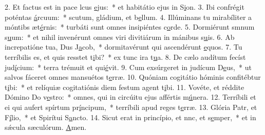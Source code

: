 2. Et factus est in pace lcus \uline{e}jus:~* et habitátio ejus in S\uline{i}on.
3. Ibi confrégit poténtas \uline{á}rcuum:~* scutum, gládium, et b\uline{e}llum.
4. Illúminans tu mirabíliter a móntibs æt\uline{é}rnis:~* turbáti sunt omnes insipiéntes c\uline{o}rde.
5. Dormiérunt smnum s\uline{u}um:~* et nihil invenérunt omnes viri divitiárum in mánibus s\uline{u}is.
6. Ab increpatióne tua, Dus J\uline{a}cob,~* dormitavérunt qui ascendérunt \uline{e}quos.
7. Tu terríbilis es, et quis resstet t\uline{i}bi?~* ex tunc ira t\uline{u}a.
8. De cælo audítum fecíst jud\uline{í}cium:~* terra trémuit et qui\uline{é}vit.
9. Cum exsúrgeret in judícum D\uline{e}us,~* ut salvos fáceret omnes mansuétos t\uline{e}rræ.
10. Quóniam cogitátio hóminis confitébtur t\uline{i}bi:~* et relíquiæ cogitatiónis diem festum agent t\uline{i}bi.
11. Vovéte, et réddite Dómino Do v\uline{e}stro:~* omnes, qui in circúitu ejus affértis m\uline{ú}nera.
12. Terríbili et ei qui aufert spírtum pr\uline{í}ncipum,~* terríbili apud reges t\uline{e}rræ.
13. Glória Patr, et F\uline{í}lio,~* et Spirítui S\uline{a}ncto.
14. Sicut erat in princípio, et nnc, et s\uline{e}mper,~* et in sǽcula sæculórum. \uline{A}men.
